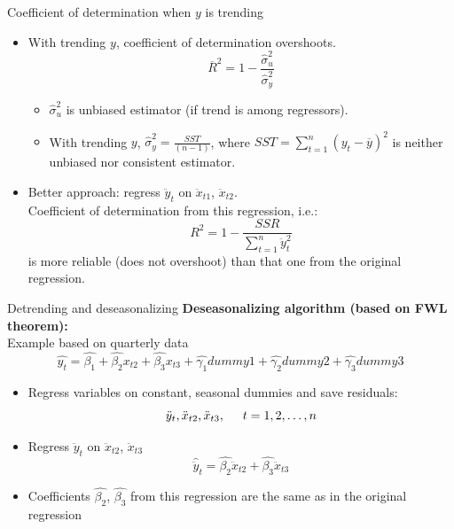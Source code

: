 \documentclass{beamer}
\begin{document}
\begin{frame}{Coefficient of determination when $y$ is trending}
\begin{itemize}
\item With trending $y$, coefficient of determination overshoots.
$$\overline{R}^2=1-\frac{\hat{\sigma}^2_u}{\hat{\sigma}^2_y}$$
\begin{itemize}
\item $\hat{\sigma}^2_u$ is unbiased estimator (if trend is among regressors).\\
\medskip
\item With trending $y$, $\hat{\sigma}^2_y=\frac{SST}{(n-1)}$, where $SST=\sum_{t=1}^n (y_t-\overline{y})^2$ is neither unbiased nor consistent estimator.
\end{itemize}
\bigskip
\item Better approach: regress $\ddot{y}_{t}$ on $\ddot{x}_{t1}$, $\ddot{x}_{t2}$.\\ 
\medskip
Coefficient of determination from this regression, i.e.: 
$$R^2=1-\frac{SSR}{\sum^n_{t=1}\ddot{y}^2_t}$$ 
is more reliable (does not overshoot) than that one from the original regression.
\end{itemize}
\end{frame}
\begin{frame}{Detrending and deseasonalizing} 
\textbf{Deseasonalizing algorithm (based on FWL theorem):} \\
\footnotesize{Example based on quarterly data} 
$$\hat{y_t}=\hat{\beta_1}+\hat{\beta_2}x_{t2}+\hat{\beta_3}x_{t3}+\hat{\gamma_1}\textit{dummy}1+\hat{\gamma_2}\textit{dummy}2+\hat{\gamma_3}\textit{dummy}3$$
\begin{itemize}
\item Regress variables on constant, seasonal dummies and save residuals: $$\ddot{y}_{t}, \ddot{x}_{t2}, \ddot{x}_{t3}, \hspace{0.5cm} t=1, 2,\dots, n$$
\item Regress $\ddot{y}_{t}$ on $\ddot{x}_{t2}$, $\ddot{x}_{t3}$
$$\hat{\ddot{y}}_{t}=\hat{\beta_2}\ddot{x}_{t2}+\hat{\beta_3}\ddot{x}_{t3}$$
\item Coefficients $\hat{\beta_2}$, $\hat{\beta_3}$ from this regression are the same as in the original regression 
\end{itemize}
\end{frame}
\end{document}
